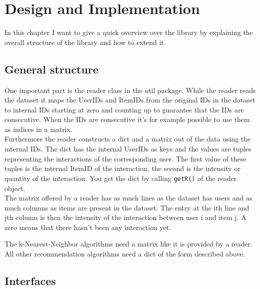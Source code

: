 
\chapter{Design and Implementation}
In this chapter I want to give a quick overview over the library
by explaining the overall structure of the library and how to extend it.


\section{General structure}
One important part is the reader class in the util package.
While the reader reads the dataset it maps the UserIDs and 
ItemIDs from the original IDs in the dataset to internal IDs 
starting at zero and counting up to guarantee that the IDs are consecutive. 
When the IDs are consecutive it's for example possible to use them as
indices in a matrix. \\Furthermore the reader constructs a dict and a matrix
out of the data using the internal IDs. The dict has the internal 
UserIDs as keys and the values are tuples representing the 
interactions of the corresponding user. The first value of these tuples is the internal
ItemID of the interaction, the second is the intensity or
quantity of the interaction. You get the dict by calling \lstinline!getR()!
of the reader object.\\
The matrix offered by a reader has as much lines as the dataset
has users and as much columns as items are present in the dataset.
The entry at the ith line and jth column is then the intensity of the interaction
between user i and item j. A zero means that there hasn't been any
interaction yet.

The k-Nearest-Neighbor algorithms need a matrix like it is provided by a
reader. All other recommendation algorithms need a dict of the 
form described above.

\section{Interfaces}


